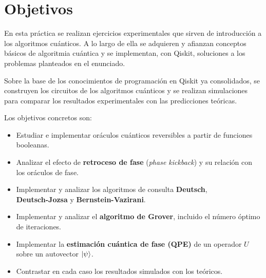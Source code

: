 \section{Objetivos}\label{sec:objetivos}

En esta práctica se realizan ejercicios experimentales que sirven de introducción a los algoritmos
cuánticos. A lo largo de ella se adquieren y afianzan conceptos básicos de algoritmia cuántica y se
implementan, con Qiskit, soluciones a los problemas planteados en el enunciado.

Sobre la base de los conocimientos de programación en Qiskit ya consolidados, se construyen los circuitos
de los algoritmos cuánticos y se realizan simulaciones para comparar los resultados experimentales con
las predicciones teóricas.

Los objetivos concretos son:
\begin{itemize}
    \item Estudiar e implementar oráculos cuánticos reversibles a partir de funciones booleanas.
    \item Analizar el efecto de \textbf{retroceso de fase} (\textit{phase kickback}) y su relación con los oráculos de fase.
    \item Implementar y analizar los algoritmos de consulta \textbf{Deutsch}, \\
    \textbf{Deutsch-Jozsa} y \textbf{Bernstein-Vazirani}.
    \item Implementar y analizar el \textbf{algoritmo de Grover}, incluido el número óptimo de iteraciones.
    \item Implementar la \textbf{estimación cuántica de fase (QPE)} de un operador $U$ sobre un autovector $\ket{\psi}$.
    \item Contrastar en cada caso los resultados simulados con los teóricos.
\end{itemize}